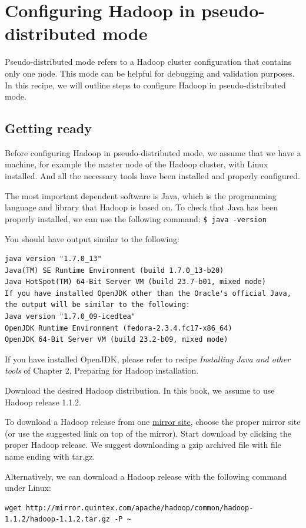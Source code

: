 \section{Configuring Hadoop in pseudo-distributed mode}
Pseudo-distributed mode refers to a Hadoop cluster configuration that contains only one node. This mode can be helpful for debugging and validation purposes. In this recipe, we will outline steps to configure Hadoop in pseudo-distributed mode.
\subsection*{Getting ready}
Before configuring Hadoop in pseudo-distributed mode, we assume that we have a machine, for example the master node of the Hadoop cluster, with Linux installed. And all the necessary tools have been installed and properly configured.

The most important dependent software is Java, which is the programming language and library that Hadoop is based on. To check that Java has been properly installed,
we can use the following command:
\verb|$ java -version|

You should have output similar to the following:
\lstset{style=bashstyle}
\begin{lstlisting}[caption=Java Version Information]
java version "1.7.0_13"
Java(TM) SE Runtime Environment (build 1.7.0_13-b20)
Java HotSpot(TM) 64-Bit Server VM (build 23.7-b01, mixed mode)
If you have installed OpenJDK other than the Oracle's official Java, the output will be similar to the following:
Java version "1.7.0_09-icedtea"
OpenJDK Runtime Environment (fedora-2.3.4.fc17-x86_64)
OpenJDK 64-Bit Server VM (build 23.2-b09, mixed mode)
\end{lstlisting}
If you have installed OpenJDK, please refer to recipe \emph{Installing Java and other tools} of Chapter 2, Preparing for Hadoop installation.

Download the desired Hadoop distribution. In this book, we assume to use Hadoop release 1.1.2.

To download a Hadoop release from one \href{http://www.apache.org/dyn/closer.cgi/hadoop/common/}{mirror site}, choose the proper mirror site (or use the suggested link on top of the mirror). Start download by clicking the proper Hadoop release. We suggest downloading a gzip archived file with file name ending with tar.gz.

Alternatively, we can download a Hadoop release with the following command under Linux:
\lstset{style=bashstyle}
\begin{lstlisting}
wget http://mirror.quintex.com/apache/hadoop/common/hadoop-1.1.2/hadoop-1.1.2.tar.gz -P ~
\end{lstlisting}

